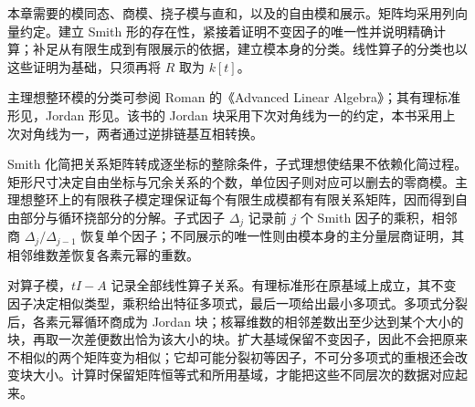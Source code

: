 \ProseParagraphBreak

本章需要的模同态、商模、挠子模与直和，以及的自由模和展示。矩阵均采用列向量约定。建立 Smith 形的存在性，紧接着证明不变因子的唯一性并说明精确计算；补足从有限生成到有限展示的依据，建立模本身的分类。线性算子的分类也以这些证明为基础，只须再将 \(R\) 取为 \(k[t]\)。

\ProseParagraphBreak
主理想整环模的分类可参阅 Roman 的《Advanced Linear Algebra》\cite[Chapter 6, Theorems 6.13, 6.16]{Roman2008AdvancedLinearAlgebra}；其有理标准形见\cite[Chapter 7, Theorem 7.16]{Roman2008AdvancedLinearAlgebra}，Jordan 形见\cite[Chapter 8, Theorem 8.6, pp. 190--192]{Roman2008AdvancedLinearAlgebra}。该书的 Jordan 块采用下次对角线为一的约定，本书采用上次对角线为一，两者通过逆排链基互相转换。







\begin{chaptersummary}
	Smith 化简把关系矩阵转成逐坐标的整除条件，子式理想使结果不依赖化简过程。矩形尺寸决定自由坐标与冗余关系的个数，单位因子则对应可以删去的零商模。主理想整环上的有限秩子模定理保证每个有限生成模都有有限关系矩阵，因而得到自由部分与循环挠部分的分解。子式因子 \(\Delta_j\) 记录前 \(j\) 个 Smith 因子的乘积，相邻商 \(\Delta_j/\Delta_{j-1}\) 恢复单个因子；不同展示的唯一性则由模本身的主分量层商证明，其相邻维数差恢复各素元幂的重数。

	\ProseParagraphBreak
	对算子模，\(tI-A\) 记录全部线性算子关系。有理标准形在原基域上成立，其不变因子决定相似类型，乘积给出特征多项式，最后一项给出最小多项式。多项式分裂后，各素元幂循环商成为 Jordan 块；核幂维数的相邻差数出至少达到某个大小的块，再取一次差便数出恰为该大小的块。扩大基域保留不变因子，因此不会把原来不相似的两个矩阵变为相似；它却可能分裂初等因子，不可分多项式的重根还会改变块大小。计算时保留矩阵恒等式和所用基域，才能把这些不同层次的数据对应起来。
\end{chaptersummary}

\BookExercises

